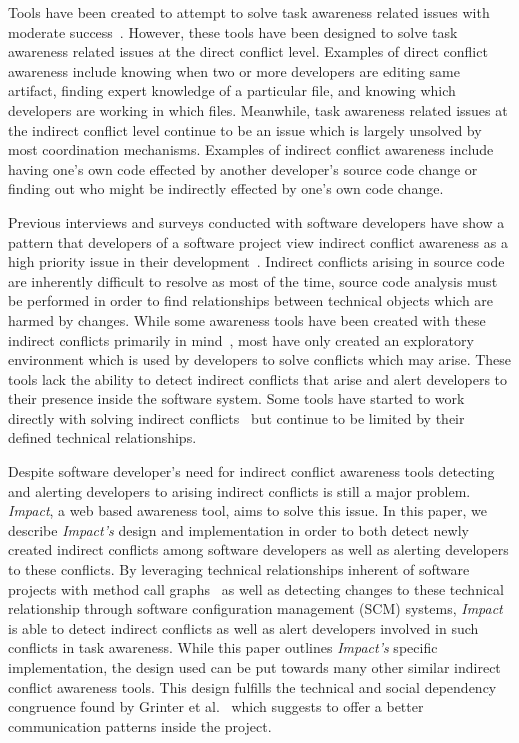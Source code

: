 \documentclass[conference]{IEEEtran}
\begin{document}
Tools have been created to attempt to solve task awareness related issues
with moderate success~\cite{Xiang:2008:ERT, Biehl:2007:FVD, Sarma:2009:TIV, Khurana:2009:PFC}. However, these tools have been designed 
to solve task awareness related issues at the direct conflict level. 
Examples of direct conflict awareness include knowing when two or more 
developers are  editing same artifact, finding expert knowledge of a
particular file, and knowing which developers are working in which files.
Meanwhile, task awareness related issues at the indirect conflict level
continue to be an issue which is largely unsolved by most coordination
mechanisms. Examples of indirect conflict awareness
include having one's own code effected by another developer's source
code change or finding out who might be indirectly effected by one's
own code change. 

Previous interviews and surveys conducted with software developers have 
show a pattern that developers of a software project view indirect conflict 
awareness  as a high priority issue in their development~\cite{Damian:2007:GSE, 
Halverson:2006:DTV, Begel:2010:CDE, Schroter:2012:TTF}.
Indirect conflicts arising in source code are inherently
difficult to resolve as most of the time, source code analysis must
be performed in order to find relationships between technical objects
which are harmed by changes.
While some awareness tools have been created with these indirect conflicts
primarily in mind~\cite{Begel:2010:CDE, Trainer:2005:BGT}, most have only 
created an exploratory environment which is used by developers to
solve conflicts which may arise. These tools lack the ability to detect
indirect conflicts that arise and alert developers to their presence 
inside the software system. Some tools have started to work directly
with solving indirect conflicts~\cite{Sarma:2007:TSA} but continue
to be limited by their defined technical relationships. 

Despite software developer's need for indirect conflict awareness tools
detecting and alerting developers to arising indirect conflicts is still a major
problem. \textit{Impact}, a web based awareness
tool, aims to solve this issue. In this paper, we describe \textit{Impact's}
design and implementation in order to both detect newly created
indirect conflicts among software developers as well as alerting developers
to these conflicts. By leveraging technical relationships inherent of 
software projects with method call graphs~\cite{Lakhotia:1993:CCM}
as well as detecting changes
to these technical relationship through software configuration management
(SCM) systems, \textit{Impact} is able to detect indirect conflicts as well as
alert developers involved in such conflicts in task awareness. While this paper
outlines \textit{Impact's} specific implementation, the design used can be put
towards many other similar indirect conflict awareness tools. This design
fulfills the technical and social dependency congruence found by 
Grinter  et al.~\cite{Grinter:2003:RCW} which suggests to offer a better 
communication patterns inside the project.
\end{document}
